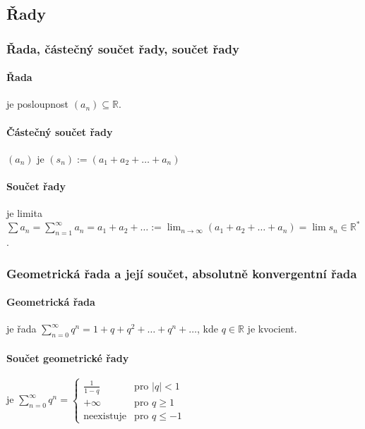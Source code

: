 \documentclass[10pt,a4paper]{article}
\newcommand{\R}{{\mathbb{R}}}
\begin{document}
\subsection{Řady}

\subsubsection{Řada, částečný součet řady, součet řady}

\paragraph*{Řada} je posloupnost $(a_n) \subseteq \R$.

\paragraph*{Částečný součet řady} $(a_n)$ je $(s_n):= (a_1 + a_2 + \dots + a_n)$

\paragraph*{Součet řady} je limita $\displaystyle \sum a_n = \sum_{n=1}^\infty a_n = a_1 + a_2 + \dots := \lim_{n\to \infty}(a_1 + a_2 + \dots + a_n) = \lim s_n \in \R^*$.

\subsubsection{Geometrická řada a její součet, absolutně konvergentní řada}

\paragraph*{Geometrická řada} je řada $\displaystyle \sum_{n=0}^{\infty}q^n = 1 + q + q^2 + \dots + q^n + \dots$, kde $q \in \R$ je kvocient.
\paragraph*{Součet geometrické řady} je $\displaystyle \sum_{n=0}^{\infty}q^n = \begin{cases}
    \frac{1}{1-q} & \text{pro } |q| < 1\\
    + \infty & \text{pro } q \geq 1\\
    \text{neexistuje} & \text{pro } q \leq -1
\end{cases}$
\end{document}
